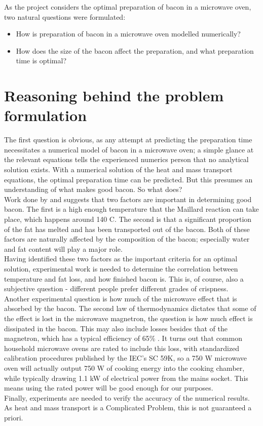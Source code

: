 As the project considers the optimal preparation of bacon in a microwave oven, two natural questions
were formulated:
\begin{itemize}
  \item How is preparation of bacon in a microwave oven modelled numerically?
  \item How does the size of the bacon affect the preparation, and what preparation time is optimal?
\end{itemize}

\section{Reasoning behind the problem formulation}
The first question is obvious, as any attempt at predicting the preparation time necessitates a
numerical model of bacon in a microwave oven; a simple glance at the relevant
equations tells the experienced numerics person that no analytical solution
exists. With a numerical solution of the heat and mass transport equations, the
optimal preparation time can be predicted. But this presumes an understanding of
what makes good bacon. So what does? \\

Work done by \cite{maillard} and \cite{intarwebz} suggests that two factors are important in
determining good bacon. The first is a high enough temperature that the Maillard
reaction can take place, which happens around 140 \textdegree C. The second is that
a significant proportion of the fat has melted and has been transported out of
the bacon. Both of these factors are naturally affected by the composition of
the bacon; especially water and fat content will play a major role. \\

Having identified these two factors as the important criteria for an optimal
solution, experimental work is needed to determine the correlation between
temperature and fat loss, and how finished bacon is. This is, of course, also a
subjective question - different people prefer different grades of crispness.\\

Another experimental question is how much of the microwave effect that is
absorbed by the bacon. The second law of thermodynamics dictates that some of
the effect is lost in the microwave magnetron, the question is how much effect
is dissipated in the bacon. This may also include losses besides that of the
magnetron, which has a typical efficiency of 65\% \cite{namba}. It turns out
that common household microwave ovens are rated to include this loss,
with standardized calibration procedures published by the IEC's SC 59K, so a 750 W
microwave oven will actually output 750 W of cooking energy into the cooking
chamber, while typically drawing 1.1 kW of electrical power from the mains
socket. This means using the rated power will be good enough for our purposes.
\\

Finally, experiments are needed to verify the accuracy of the numerical results.
As heat and mass transport is a Complicated Problem, this is not guaranteed a
priori.

\setcounter{secnumdepth}{2}
